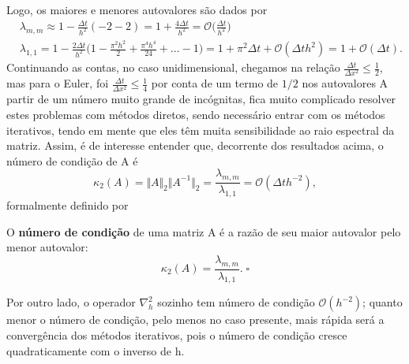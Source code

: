 \documentclass[../differential_methods.tex]{subfiles}
\begin{document}
Logo, os maiores e menores autovalores são dados por
\begin{align*}
	 & \lambda_{m, m}\approx 1 - \frac{\Delta t}{h^{2}}(-2 -2) = 1 + \frac{4\Delta t}{h^{2}}=\mathcal{O}\biggl(\frac{\Delta t}{h^{2}}\biggr)                                                                      \\
	 & \lambda_{1, 1}= 1 - \frac{2\Delta t}{h^{2}}\biggl(1 - \frac{\pi^{2}h^{2}}{2} + \frac{\pi^{4}h^{4}}{24} + \dotsc - 1\biggr) = 1 + \pi^{2}\Delta t + \mathcal{O}(\Delta th^{2}) = 1 + \mathcal{O}(\Delta t).
\end{align*}
Continuando as contas, no caso unidimensional, chegamos na relação \(\displaystyle \frac{\Delta t}{\Delta x^{2}} \leq \frac{1}{2}\), mas para o Euler, foi \(\displaystyle \frac{\Delta t}{\Delta x^{2}} \leq \frac{1}{4}\) por conta de um termo de \(1/2\) nos autovalores
A partir de um número muito grande de incógnitas, fica muito complicado resolver estes problemas com métodos diretos, sendo necessário entrar com os métodos iterativos, tendo em mente que eles têm muita sensibilidade ao raio espectral da matriz. Assim, é de interesse entender que, decorrente dos resultados acima, o número de condição de A é
\[
	\kappa_{2}(A)=\Vert A \Vert_{2}\Vert A^{-1} \Vert_{2} = \frac{\lambda_{m, m}}{\lambda_{1, 1}} = \mathcal{O}(\Delta t h^{-2}),
\]
formalmente definido por
\begin{def*}
	O \textbf{número de condição} de uma matriz A é a razão de seu maior autovalor pelo menor autovalor:
	\[
		\kappa_2(A) = \frac{\lambda_{m, m}}{\lambda_{1, 1}}.\; \square
	\]
\end{def*}
Por outro lado, o operador \(\nabla_{h}^{2}\) sozinho tem número de condição \(\mathcal{O}(h^{-2})\); quanto menor o número de condição, pelo menos no caso presente, mais rápida será a convergência dos métodos iterativos, pois o número de condição cresce quadraticamente com o inverso de h.
\end{document}
